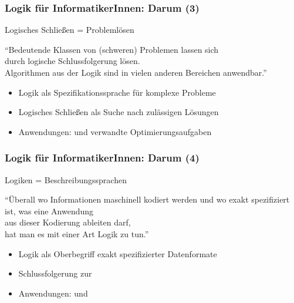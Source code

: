 \documentclass[aspectratio=1610,onlymath]{beamer}
\begin{document}
\begin{frame}\frametitle{Logik für InformatikerInnen: Darum (3)}

\begin{center}
\LARGE 
Logisches Schließen = Problemlösen

\bigskip
\large
"`Bedeutende Klassen von (schweren) Problemen lassen sich\\ durch logische Schlussfolgerung lösen.\\
Algorithmen aus der Logik sind in vielen anderen Bereichen anwendbar."'
\end{center}


\begin{itemize}
\item Logik als Spezifikationssprache für komplexe Probleme
\item Logisches Schließen als Suche nach zulässigen Lösungen
\item Anwendungen:  und verwandte Optimierungsaufgaben
\end{itemize}

\end{frame}

\begin{frame}\frametitle{Logik für InformatikerInnen: Darum (4)}

\begin{center}
\LARGE 
Logiken = Beschreibungssprachen

\bigskip
\large
"`Überall wo Informationen maschinell kodiert werden und wo exakt spezifiziert ist, was eine Anwendung\\ aus dieser Kodierung ableiten darf,\\hat man es mit einer Art Logik zu tun."'
\end{center}


\begin{itemize}
\item Logik als Oberbegriff exakt spezifizierter Datenformate
\item Schlussfolgerung zur 
\item Anwendungen:  und 
\end{itemize}
\end{frame}
\end{document}
